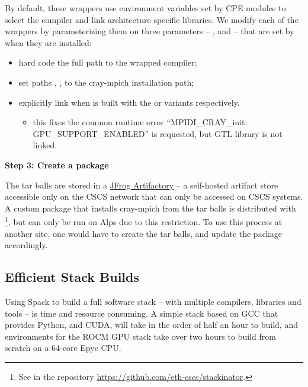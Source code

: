 By default, these wrappers use environment variables set by CPE modules to select the compiler and link architecture-specific libraries.
We modify each of the wrappers by parameterizing them on three parameters -- ,  and  --
that are set by \spack when they are installed:
\begin{itemize}
    \item hard code the full path to the wrapped compiler;
    \item set paths , , to the cray-mpich \spack installation path;
    \item explicitly link   when \craympich is built with the  or  variants respectively.
    \begin{itemize}
          \item this fixes the common runtime error ``MPIDI\_CRAY\_init: GPU\_SUPPORT\_ENABLED'' is requested, but GTL library is not linked.
    \end{itemize}
\end{itemize}

\noindent\textbf{Step 3: Create a \spack package}

The tar balls are stored in a \href{https://jfrog.com/artifactory/}{JFrog Artifactory} -- a self-hosted artifact store accessible only on the CSCS network that can only be accessed on CSCS systems.
A custom \spack package that installs cray-mpich from the tar balls is distributed with \stackinator\footnote{See  in the repository \url{https://github.com/eth-cscs/stackinator}.}, but can only be run on Alps due to this restriction.
To use this process at another site, one would have to create the tar balls, and update the \spack package accordingly.

\subsection{Efficient Stack Builds}
\label{sec:faster-builds}

Using Spack to build a full software stack -- with multiple compilers, libraries and tools -- is time and resource consuming.
A simple stack based on GCC that provides Python, \craympich and CUDA, will take in the order of half an hour to build, and environments for the ROCM GPU stack take over two hours to build from scratch on a 64-core Epyc CPU.

